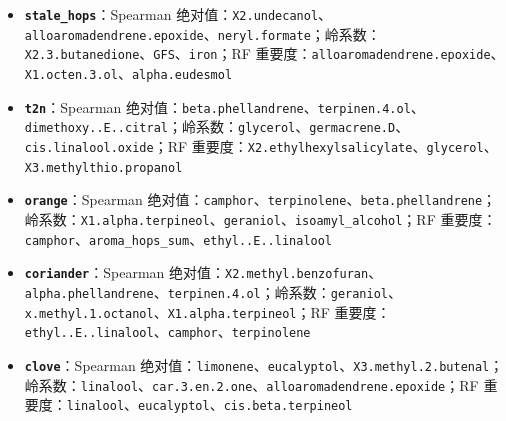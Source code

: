 \documentclass[
  11pt,
]{ctexart}
\begin{document}
\begin{itemize}
  \textbf{\texttt{metallic}}：Spearman
  绝对值：\texttt{iron}、\texttt{H2S}、\texttt{linalool.\allowbreak{}isovalerate}；岭系数：\texttt{iron}、\texttt{neryl.formate}、\texttt{ethyl\_\allowbreak{}isovalerate}；RF
  重要度：\texttt{iron}、\texttt{isopentyl\_\allowbreak{}acetate}、\texttt{esters\_sum}
\item
  \textbf{\texttt{stale\_hops}}：Spearman
  绝对值：\texttt{X2.undecanol}、\texttt{alloaromadendrene.\allowbreak{}epoxide}、\texttt{neryl.formate}；岭系数：\texttt{X2.\allowbreak{}3.\allowbreak{}butanedione}、\texttt{GFS}、\texttt{iron}；RF
  重要度：\texttt{alloaromadendrene.\allowbreak{}epoxide}、\texttt{X1.octen.3.ol}、\texttt{alpha.\allowbreak{}eudesmol}
\item
  \textbf{\texttt{t2n}}：Spearman
  绝对值：\texttt{beta.\allowbreak{}phellandrene}、\texttt{terpinen.4.ol}、\texttt{dimethoxy.\allowbreak{}.\allowbreak{}E.\allowbreak{}.\allowbreak{}citral}；岭系数：\texttt{glycerol}、\texttt{germacrene.D}、\texttt{cis.\allowbreak{}linalool.\allowbreak{}oxide}；RF
  重要度：\texttt{X2.\allowbreak{}ethylhexylsalicylate}、\texttt{glycerol}、\texttt{X3.\allowbreak{}methylthio.\allowbreak{}propanol}
\item
  \textbf{\texttt{orange}}：Spearman
  绝对值：\texttt{camphor}、\texttt{terpinolene}、\texttt{beta.\allowbreak{}phellandrene}；岭系数：\texttt{X1.\allowbreak{}alpha.\allowbreak{}terpineol}、\texttt{geraniol}、\texttt{isoamyl\_\allowbreak{}alcohol}；RF
  重要度：\texttt{camphor}、\texttt{aroma\_\allowbreak{}hops\_\allowbreak{}sum}、\texttt{ethyl.\allowbreak{}.\allowbreak{}E.\allowbreak{}.\allowbreak{}linalool}
\item
  \textbf{\texttt{coriander}}：Spearman
  绝对值：\texttt{X2.\allowbreak{}methyl.\allowbreak{}benzofuran}、\texttt{alpha.\allowbreak{}phellandrene}、\texttt{terpinen.4.ol}；岭系数：\texttt{geraniol}、\texttt{x.\allowbreak{}methyl.\allowbreak{}1.\allowbreak{}octanol}、\texttt{X1.\allowbreak{}alpha.\allowbreak{}terpineol}；RF
  重要度：\texttt{ethyl.\allowbreak{}.\allowbreak{}E.\allowbreak{}.\allowbreak{}linalool}、\texttt{camphor}、\texttt{terpinolene}
\item
  \textbf{\texttt{clove}}：Spearman
  绝对值：\texttt{limonene}、\texttt{eucalyptol}、\texttt{X3.\allowbreak{}methyl.\allowbreak{}2.\allowbreak{}butenal}；岭系数：\texttt{linalool}、\texttt{car.\allowbreak{}3.\allowbreak{}en.\allowbreak{}2.\allowbreak{}one}、\texttt{alloaromadendrene.\allowbreak{}epoxide}；RF
  重要度：\texttt{linalool}、\texttt{eucalyptol}、\texttt{cis.\allowbreak{}beta.\allowbreak{}terpineol}

\end{itemize}
\end{document}
